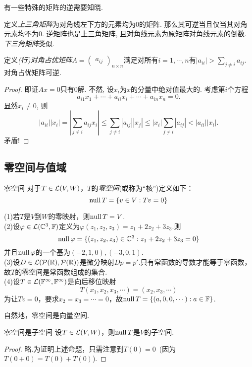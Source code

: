 有一些特殊的矩阵的逆需要知晓. 

定义\textit{上三角矩阵}为对角线左下方的元素均为$0$的矩阵. 那么其可逆当且仅当其对角元素均不为$0$. 逆矩阵也是上三角矩阵, 且对角线元素为原矩阵对角线元素的倒数. \textit{下三角矩阵}类似. 

定义\textit{(行)对角占优矩阵}$A=\begin{pmatrix}
	a_{ij}
\end{pmatrix}_{n\times n}$满足对所有$i=1,\cdots ,n$有$|a_{ii}|>\sum_{j\neq i}a_{ij}$. 对角占优矩阵可逆. 

\begin{proof}
	即证$Ax=0$只有$0$解. 不然, 设$x_i$为$x$的分量中绝对值最大的. 考虑第$i$个方程$$a_{i1}x_1 + \cdots + a_{ii}x_i + \cdots + a_{in}x_n = 0.$$
	显然$x_i \neq 0$, 则$$|a_{ii}||x_i| = \left| \sum_{j\neq i} a_{ij}x_i \right| \leq \sum_{j\neq i} |a_{ij}||x_j| \leq |x_i|\sum_{j\neq i} |a_{ij}| < |a_{ii}||x_i|.$$
	矛盾! 
\end{proof}

\subsection{零空间与值域}

\begin{definition}{零空间}
	对于$T \in \mathcal{L} (V,W)$，$T$的\textit{零空间}(或称为“核”)定义如下：$$\operatorname{null} T = \{ v \in V:Tv=0 \}$$
\end{definition}

\begin{example}{}
	(1)若$T$是$V$到$W$的零映射，则$\operatorname{null} T=V$. \\
	(2)设$\varphi \in \mathcal{L} (\mathbb{C} ^3,\mathbb{F})$定义为$\varphi (z_1,z_2,z_3)=z_1+2z_2+3z_3$.则$$\operatorname{null} \varphi = \{ (z_1,z_2,z_3) \in \mathbb{C} ^3 : z_1+2z_2+3z_3=0 \}$$
	并且$\operatorname{null} \varphi$的一个基为$(-2,1,0),(-3,0,1)$. \\
	(3)设$D \in \mathcal{L} (\mathcal{P}(\mathbb{R}),\mathcal{P}(\mathbb{R}))$是微分映射$Dp=p'$.只有常函数的导数才能等于零函数，故$T$的零空间是常函数组成的集合. \\
	(4)设$T \in \mathcal{L} (\mathbb{F} ^{\infty},\mathbb{F} ^{\infty})$是向后移位映射$$T(x_1,x_2,x_3, \cdots )=(x_2,x_3,\cdots )$$
	为让$Tv=0$，要求$x_2=x_3=\cdots =0$，故$\operatorname{null} T = \{ (a,0,0,\cdots ) :a \in \mathbb{F} \}$.
\end{example}

自然地，零空间是向量空间.

\begin{proposition}{零空间是子空间}
	设$T \in \mathcal{L} (V,W)$，则$\operatorname{null} T$是$V$的子空间.
\end{proposition}
\begin{proof}
	略.为证明上述命题，只需注意到$T(0)=0$~(因为$T(0+0)=T(0)+T(0)$).
\end{proof}

